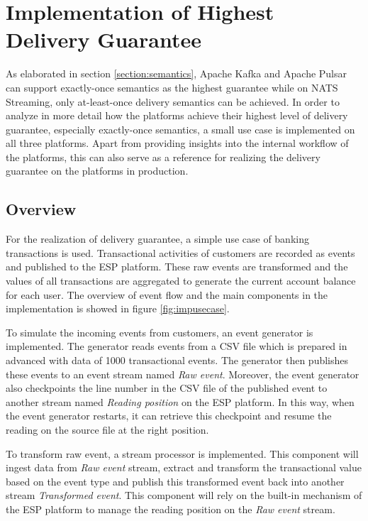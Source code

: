 \chapter{Implementation of Highest Delivery Guarantee} \label{chap:implementation}
As elaborated in section \ref{section:semantics}, Apache Kafka and Apache Pulsar can support exactly-once semantics as the highest guarantee while on NATS Streaming, only at-least-once delivery semantics can be achieved. In order to analyze in more detail how the platforms achieve their highest level of delivery guarantee, especially exactly-once semantics, a small use case is implemented on all three platforms. Apart from providing insights into the internal workflow of the platforms, this can also serve as a reference for realizing the delivery guarantee on the platforms in production. 
\section{Overview}
For the realization of delivery guarantee, a simple use case of banking transactions is used. Transactional activities of customers are recorded as events and published to the ESP platform. These raw events are transformed and the values of all transactions are aggregated to generate the current account balance for each user. The overview of event flow and the main components in the implementation is showed in figure \ref{fig:impusecase}.

To simulate the incoming events from customers, an event generator is implemented. The generator reads events from a CSV file which is prepared in advanced with data of 1000 transactional events. The generator then publishes these events to an event stream named \emph{Raw event}. Moreover, the event generator also checkpoints the line number in the CSV file of the published event to another stream named \emph{Reading position} on the ESP platform. In this way, when the event generator restarts, it can retrieve this checkpoint and resume the reading on the source file at the right position. 

To transform raw event, a stream processor is implemented. This component will ingest data from \emph{Raw event} stream, extract and transform the transactional value based on the event type and publish this transformed event back into another stream \emph{Transformed event}. This component will rely on the built-in mechanism of the ESP platform to manage the reading position on the \emph{Raw event} stream.



